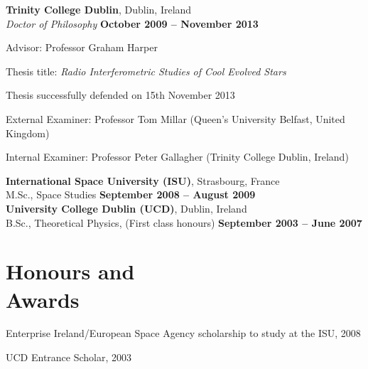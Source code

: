 \documentclass[margin,line]{resume}
\begin{document}
\begin{resume}
    \textbf{Trinity College Dublin}, Dublin, Ireland \vspace{1mm}\\\vspace{0.5mm}%
    \textsl{Doctor of Philosophy} \hfill \textbf{ October 2009 -- November 2013}\vspace{-3mm}\\\vspace{-1mm}%
    \begin{list2}
        \item Advisor:  Professor Graham Harper
        \item  Thesis title: \textit{Radio Interferometric Studies of Cool Evolved Stars}
        \item  Thesis successfully defended on 15th November 2013
            \begin{list2}
        	\item External Examiner:  Professor Tom Millar (Queen's University Belfast, United Kingdom)
        	\item Internal Examiner:  Professor Peter Gallagher (Trinity College Dublin, Ireland)
        	\end{list2}\vspace{-1.0mm}
    \end{list2}\vspace{-1.0mm}
    \textbf{International Space University (ISU)}, Strasbourg, France \vspace{0.5mm}\\\vspace{1mm}%
     M.Sc., Space Studies \hfill \textbf{ September 2008 -- August 2009}\vspace{3mm}\\\vspace{-1mm}
   \textbf{\hspace{-2.3mm} University College Dublin (UCD)}, Dublin, Ireland \vspace{1.5mm}\\\vspace{1mm}%
     B.Sc., Theoretical Physics, (First class honours) \hfill \textbf{ September 2003 -- June 2007}\vspace{-2mm}\\\vspace{-1mm}%

    \vspace{2mm}
    \section{\mysidestyle Honours and\\Awards} 
	\begin{list2}
    \item Enterprise Ireland/European Space Agency scholarship to study at the ISU, 2008
    \item UCD Entrance Scholar, 2003 \vspace{-1mm}\\%
    \end{list2}   


\end{resume}
\end{document}

